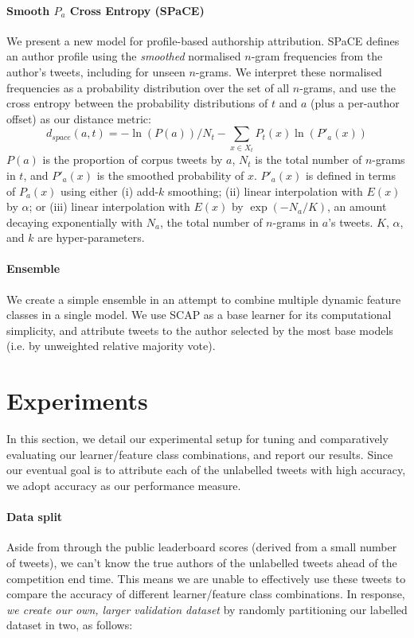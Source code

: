 \documentclass[twocolumn,10pt]{article}
\begin{document}
\paragraph{Smooth $P_a$ Cross Entropy (SPaCE)}
We present a new model for profile-based authorship attribution.
SPaCE defines an author profile using the \emph{smoothed}
normalised $n$-gram frequencies from the author's tweets,
including for unseen $n$-grams. 
We interpret these normalised frequencies as a probability
distribution over the set of all $n$-grams, and use the cross
entropy between the probability distributions of $t$ and $a$
(plus a per-author offset) as our distance metric:
$$
d_{space}(a, t) =
    - \ln (P(a)) / N_t
    - \sum_{x \in X_t} P_t(x) \ln (P'_a(x))
$$
$P(a)$ is the proportion of corpus tweets by $a$,
$N_t$ is the total number of $n$-grams in $t$, and
$P'_a(x)$ is the smoothed probability of $x$.
$P'_a(x)$ is defined in terms of $P_a(x)$ using either
(i)   add-$k$ smoothing;
(ii)  linear interpolation with $E(x)$ by $\alpha$; or
(iii) linear interpolation with $E(x)$ by $\exp(-N_a/K)$,
      an amount decaying exponentially with $N_a$,
      the total number of $n$-grams in $a$'s tweets.
$K$, $\alpha$, and $k$ are hyper-parameters.

\paragraph{Ensemble}
We create a simple ensemble in an attempt to combine multiple
dynamic feature classes in a single model.
We use SCAP as a base learner for its computational simplicity,
and attribute tweets to the author selected by the most
base models (i.e. by unweighted relative majority vote).




\section{Experiments}
In this section, we detail our experimental setup for tuning
and comparatively evaluating our learner/feature class
combinations, and report our results.
Since our eventual goal is to attribute each of the unlabelled
tweets with high accuracy, we adopt accuracy as our performance
measure.

\paragraph{Data split}

Aside from through the public leaderboard scores (derived from a
small number of tweets), we can't know the true authors of the
unlabelled tweets ahead of the competition end time.
This means we are unable to effectively use these tweets to compare
the accuracy of different learner/feature class combinations.
In response, \emph{we create our own, larger validation dataset}
by randomly partitioning our labelled dataset in two, as follows:
\end{document}
